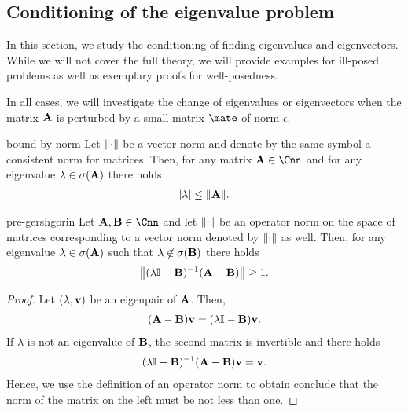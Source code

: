\subsection{Conditioning of the eigenvalue problem}

In this section, we study the conditioning of finding eigenvalues and
eigenvectors. While we will not cover the full theory, we will provide
examples for ill-posed problems as well as exemplary proofs for
well-posedness.

In all cases, we will investigate the change of eigenvalues or
eigenvectors when the matrix $\mata$ is perturbed by a small matrix
$\mate$ of norm $\epsilon$.

\begin{Lemma}{bound-by-norm}
  Let $\norm{\cdot}$ be a vector norm and denote by the same symbol
  a consistent norm for matrices. Then, for any matrix $\mata\in\Cnn$
  and for any eigenvalue $\lambda\in\sigma(\mata)$ there holds
  \begin{gather}
    \abs{\lambda} \le \norm{\mata}.
  \end{gather}
\end{Lemma}

\begin{Lemma}{pre-gershgorin}
  Let $\mata,\matb\in\Cnn$ and let $\norm{\cdot}$ be an operator norm
  on the space of matrices corresponding to a vector norm denoted by
  $\norm{\cdot}$ as well. Then, for any eigenvalue
  $\lambda\in\sigma(\mata)$ such that $\lambda\not\in\sigma(\matb)$
  there holds
  \begin{gather}
    \norm*{(\lambda\id-\matb)^{-1}(\mata-\matb)} \ge 1.
  \end{gather}
\end{Lemma}

\begin{proof}
  Let $(\lambda,\vv)$ be an eigenpair of $\mata$. Then,
  \begin{gather}
    (\mata-\matb)\vv = (\lambda\id-\matb) \vv.
  \end{gather}
  If $\lambda$ is not an eigenvalue of $\matb$, the second matrix is invertible and there holds
  \begin{gather}
    (\lambda\id-\matb)^{-1}(\mata-\matb)\vv = \vv.
  \end{gather}
  Hence, we use the definition of an operator norm to obtain conclude
  that the norm of the matrix on the left must be not less than one.
\end{proof}

